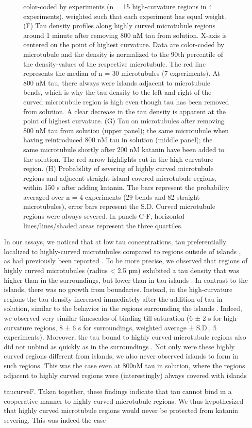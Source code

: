 \begin{figure}[h!]
{color-coded by experiments (n = 15 high-curvature regions in 4 experiments), weighted such that each experiment has equal weight. (F) Tau density profiles along highly curved microtubule regions around 1 minute after removing 800 nM tau from solution. X-axis is centered on the point of highest curvature. Data are color-coded by microtubule and the density is normalized to the 90th percentile of the density-values of the respective microtubule. The red line represents the median of n = 30 microtubules (7 experiments). At 800 nM tau, there always were islands adjacent to microtubule bends, which is why the tau density to the left and right of the curved microtubule region is high even though tau has been removed from solution. A clear decrease in the tau density is apparent at the point of highest curvature. (G) Tau on microtubules after removing 800 nM tau from solution (upper panel); the same microtubule when having reintroduced 800 nM tau in solution (middle panel); the same microtubule shortly after 200 nM katanin have been added to the solution. The red arrow highlights cut in the high curvature region. (H) Probability of severing of highly curved microtubule regions and adjacent straight island-covered microtubule regions, within 150 s after adding katanin. The bars represent the probability averaged over n = 4 experiments (29 bends and 82 straight microtubules), error bars represent the S.D. Curved microtubule regions were always severed. In panels C-F, horizontal lines/lines/shaded areas represent the three quartiles.
	}\label{taucurve}
\end{figure}
In our assays, we noticed that at low tau concentrations, tau preferentially localized to highly-curved microtubules compared to regions outside of islands , as had previously been reported \parencite{Samsonov2004}. To be more precise, we observed that regions of highly curved microtubules (radius < 2.5 µm) exhibited a tau density that was higher than in the surroundings, but lower than in tau islands . In contrast to the islands, there was no growth from boundaries. Instead, in the high-curvature regions the tau density increased immediately after the addition of tau in solution, similar to the behavior in the regions surrounding the islands . Indeed, we observed very similar timescales of binding till saturation (6 ± 2 s for high-curvature regions, 8 ± 6 s for surroundings, weighted average ± S.D., 5 experiments). Moreover, the tau bound to highly curved microtubule regions also did not unbind as quickly as in the surroundings . Not only were these highly curved regions different from islands, we also never observed islands to form in such regions. This was the case even at 800nM tau in solution, where the regions adjacent to highly curved regions were (interestingly) always covered with islands \par{taucurve}{F}. Taken together, these findings indicate that tau cannot bind in a cooperative manner to highly curved microtubule regions. We thus hypothesized that highly curved microtubule regions would never be protected from katanin severing. This was indeed the case 